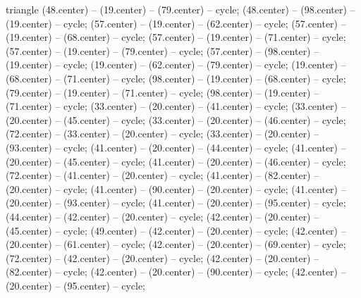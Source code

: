 \begin{pgfonlayer}{triangle}
 (48.center) -- (19.center) -- (79.center) -- cycle; 
 (48.center) -- (98.center) -- (19.center) -- cycle; 
 (57.center) -- (19.center) -- (62.center) -- cycle; 
 (57.center) -- (19.center) -- (68.center) -- cycle; 
 (57.center) -- (19.center) -- (71.center) -- cycle; 
 (57.center) -- (19.center) -- (79.center) -- cycle; 
 (57.center) -- (98.center) -- (19.center) -- cycle; 
 (19.center) -- (62.center) -- (79.center) -- cycle; 
 (19.center) -- (68.center) -- (71.center) -- cycle; 
 (98.center) -- (19.center) -- (68.center) -- cycle; 
 (79.center) -- (19.center) -- (71.center) -- cycle; 
 (98.center) -- (19.center) -- (71.center) -- cycle; 
 (33.center) -- (20.center) -- (41.center) -- cycle; 
 (33.center) -- (20.center) -- (45.center) -- cycle; 
 (33.center) -- (20.center) -- (46.center) -- cycle; 
 (72.center) -- (33.center) -- (20.center) -- cycle; 
 (33.center) -- (20.center) -- (93.center) -- cycle; 
 (41.center) -- (20.center) -- (44.center) -- cycle; 
 (41.center) -- (20.center) -- (45.center) -- cycle; 
 (41.center) -- (20.center) -- (46.center) -- cycle; 
 (72.center) -- (41.center) -- (20.center) -- cycle; 
 (41.center) -- (82.center) -- (20.center) -- cycle; 
 (41.center) -- (90.center) -- (20.center) -- cycle; 
 (41.center) -- (20.center) -- (93.center) -- cycle; 
 (41.center) -- (20.center) -- (95.center) -- cycle; 
 (44.center) -- (42.center) -- (20.center) -- cycle; 
 (42.center) -- (20.center) -- (45.center) -- cycle; 
 (49.center) -- (42.center) -- (20.center) -- cycle; 
 (42.center) -- (20.center) -- (61.center) -- cycle; 
 (42.center) -- (20.center) -- (69.center) -- cycle; 
 (72.center) -- (42.center) -- (20.center) -- cycle; 
 (42.center) -- (20.center) -- (82.center) -- cycle; 
 (42.center) -- (20.center) -- (90.center) -- cycle; 
 (42.center) -- (20.center) -- (95.center) -- cycle; 

\end{pgfonlayer}
